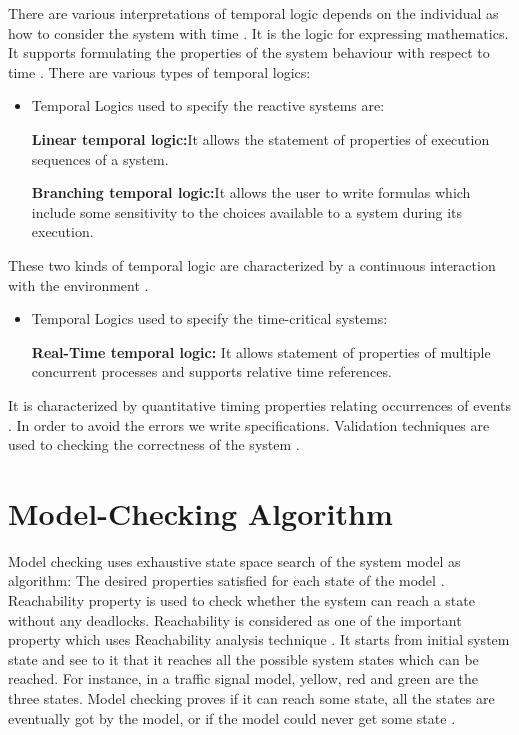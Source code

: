 \documentclass[a4paper,10pt]{report}
\begin{document}
There are various interpretations of temporal logic depends on the individual as how to consider the system with time \cite{Berard}. It is the logic for expressing mathematics. It supports formulating the properties of the system behaviour with respect to time \cite{Berard}. There are various types of temporal logics:
\begin{itemize}
\item Temporal Logics used to specify the reactive systems are:

\textbf{Linear temporal logic:}It allows the statement of properties of execution sequences of a system.

 \textbf{Branching temporal logic:}It allows the user to write formulas which include some sensitivity to the choices available to a system during its execution.
\end{itemize}
 These two kinds of temporal logic are characterized by a continuous interaction with the environment \cite{Engler}.
\begin{itemize}
\item Temporal Logics used to specify the time-critical systems:

 \textbf{Real-Time temporal logic:}  It allows statement of properties of multiple concurrent processes and supports relative time references.
\end{itemize}

It is characterized by quantitative timing properties relating occurrences of events \cite{Engler}.
In order to avoid the errors we write specifications. Validation techniques are used to checking the correctness of the system \cite{Wang2007}.  

\section{Model-Checking Algorithm}
\label{Model chec Algo}

Model checking uses exhaustive state space search of the system model as algorithm: The desired properties satisfied for each state of the model \cite{Berard}. Reachability property is used to check whether the system can reach a state without any deadlocks. Reachability is considered as one of the important property which uses Reachability analysis technique \cite{M.Davis1962}. It starts from initial system state and see to it that it reaches all the possible system states which can be reached. For instance, in a traffic signal model, yellow, red and green are the three states. Model checking proves if it can reach some state, all the states are eventually got by the model, or if the model could never get some state \cite{M.Davis1962}.
\end{document}
